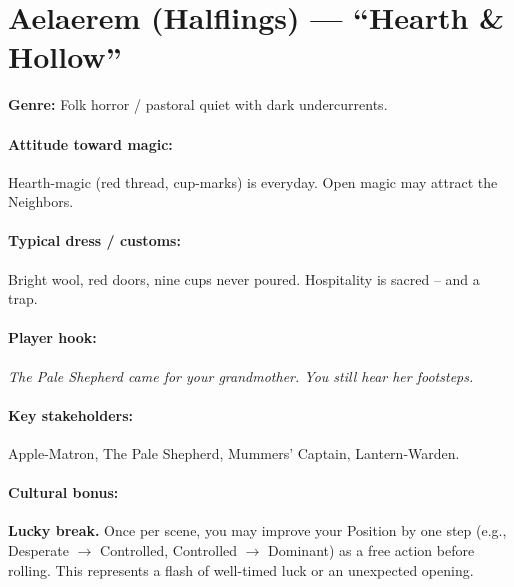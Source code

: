 \section{Aelaerem (Halflings) --- ``Hearth \& Hollow''}
\textbf{Genre:} Folk horror / pastoral quiet with dark undercurrents.

\paragraph{Attitude toward magic:} Hearth-magic (red thread, cup-marks) is everyday. Open magic may attract the Neighbors.

\paragraph{Typical dress / customs:} Bright wool, red doors, nine cups never poured. Hospitality is sacred -- and a trap.

\paragraph{Player hook:} \emph{The Pale Shepherd came for your grandmother. You still hear her footsteps.}

\paragraph{Key stakeholders:} Apple-Matron, The Pale Shepherd, Mummers' Captain, Lantern-Warden.

\paragraph{Cultural bonus:} \textbf{Lucky break.} Once per scene, you may improve your Position by one step (e.g., Desperate $\rightarrow$ Controlled, Controlled $\rightarrow$ Dominant) as a free action before rolling. This represents a flash of well-timed luck or an unexpected opening.

